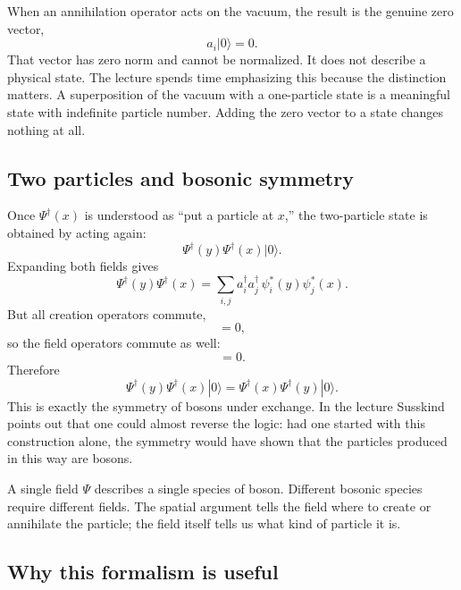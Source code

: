 When an annihilation operator acts on the vacuum, the result is the genuine zero vector,
\begin{equation}
a_i|0\rangle=0.
\end{equation}
That vector has zero norm and cannot be normalized. It does not describe a physical state. The lecture spends time emphasizing this because the distinction matters. A superposition of the vacuum with a one-particle state is a meaningful state with indefinite particle number. Adding the zero vector to a state changes nothing at all.

\subsection{Two particles and bosonic symmetry}

Once \(\Psi^\dagger(x)\) is understood as ``put a particle at \(x\),''
the two-particle state is obtained by acting again:
\begin{equation}
\Psi^\dagger(y)\Psi^\dagger(x)|0\rangle.
\end{equation}
Expanding both fields gives
\begin{equation}
\Psi^\dagger(y)\Psi^\dagger(x)
=
\sum_{i,j} a_i^\dagger a_j^\dagger\,\psi_i^*(y)\psi_j^*(x).
\end{equation}
But all creation operators commute,
\begin{equation}
[a_i^\dagger,a_j^\dagger]=0,
\end{equation}
so the field operators commute as well:
\begin{equation}
[\Psi^\dagger(x),\Psi^\dagger(y)]=0.
\end{equation}
Therefore
\begin{equation}
\Psi^\dagger(y)\Psi^\dagger(x)|0\rangle
=
\Psi^\dagger(x)\Psi^\dagger(y)|0\rangle.
\end{equation}
This is exactly the symmetry of bosons under exchange. In the lecture Susskind points out that one could almost reverse the logic: had one started with this construction alone, the symmetry would have shown that the particles produced in this way are bosons.

A single field \(\Psi\) describes a single species of boson. Different bosonic species require different fields. The spatial argument tells the field where to create or annihilate the particle; the field itself tells us what kind of particle it is.

\subsection{Why this formalism is useful}

